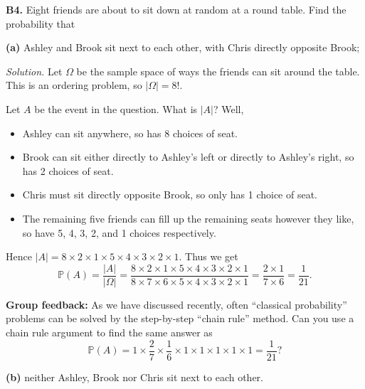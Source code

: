 \documentclass[
  a4paper,
]{book}
\providecommand{\tightlist}{%
  \setlength{\itemsep}{0pt}\setlength{\parskip}{0pt}}
\theoremstyle{definition}
\theoremstyle{definition}
\theoremstyle{definition}
\theoremstyle{definition}
\theoremstyle{remark}
\begin{document}
\textbf{B4.} Eight friends are about to sit down at random at a round table. Find the probability that

\textbf{(a)} Ashley and Brook sit next to each other, with Chris directly opposite Brook;

\begin{myanswers}
\emph{Solution.}
Let \(\Omega\) be the sample space of ways the friends can sit around the table. This is an ordering problem, so \(|\Omega| = 8!\).

Let \(A\) be the event in the question. What is \(|A|\)? Well,

\begin{itemize}
\tightlist
\item
  Ashley can sit anywhere, so has 8 choices of seat.
\item
  Brook can sit either directly to Ashley's left or directly to Ashley's right, so has 2 choices of seat.
\item
  Chris must sit directly opposite Brook, so only has 1 choice of seat.
\item
  The remaining five friends can fill up the remaining seats however they like, so have 5, 4, 3, 2, and 1 choices respectively.
\end{itemize}

Hence \(|A| = 8 \times 2 \times 1 \times 5 \times 4 \times 3 \times 2 \times 1\). Thus we get
\[ \mathbb P(A) = \frac{|A|}{|\Omega|} = \frac{8 \times 2 \times 1 \times 5 \times 4 \times 3 \times 2 \times 1}{8 \times 7 \times 6 \times 5 \times 4 \times 3 \times 2 \times 1} = \frac{2 \times 1}{7 \times 6} = \frac{1}{21} . \]

\textbf{Group feedback:} As we have discussed recently, often ``classical probability'' problems can be solved by the step-by-step ``chain rule'' method. Can you use a chain rule argument to find the same answer as
\[ \mathbb P(A) = 1 \times \frac27 \times \frac16 \times 1 \times 1 \times 1 \times 1 \times 1 = \frac{1}{21} ? \]

\end{myanswers}

\textbf{(b)} neither Ashley, Brook nor Chris sit next to each other.
\end{document}
